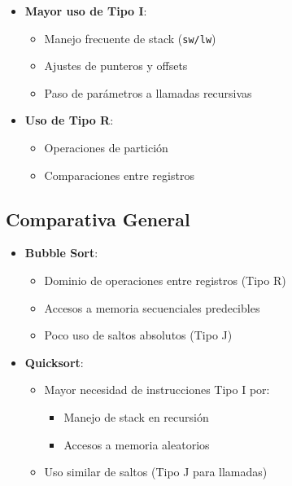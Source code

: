 \documentclass{article}
\begin{document}
\begin{itemize}
    \item \textbf{Mayor uso de Tipo I}:
    \begin{itemize}
        \item Manejo frecuente de stack (\texttt{sw/lw})
        \item Ajustes de punteros y offsets
        \item Paso de parámetros a llamadas recursivas
    \end{itemize}
    
    \item \textbf{Uso de Tipo R}:
    \begin{itemize}
        \item Operaciones de partición
        \item Comparaciones entre registros
    \end{itemize}
\end{itemize}

\subsection*{Comparativa General}

\begin{itemize}
    \item \textbf{Bubble Sort}:
    \begin{itemize}
        \item Dominio de operaciones entre registros (Tipo R)
        \item Accesos a memoria secuenciales predecibles
        \item Poco uso de saltos absolutos (Tipo J)
    \end{itemize}
    
    \item \textbf{Quicksort}:
    \begin{itemize}
        \item Mayor necesidad de instrucciones Tipo I por:
        \begin{itemize}
            \item Manejo de stack en recursión
            \item Accesos a memoria aleatorios
        \end{itemize}
        \item Uso similar de saltos (Tipo J para llamadas)
    \end{itemize}
\end{itemize}
\end{document}
